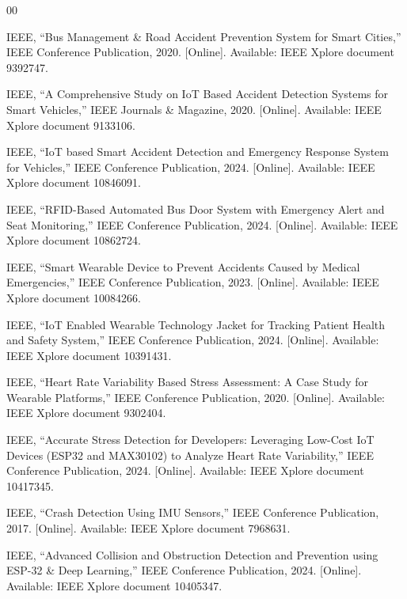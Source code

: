 \documentclass[conference]{IEEEtran}
\begin{document}
\begin{thebibliography}{00}

IEEE, ``Bus Management \& Road Accident Prevention System for Smart Cities,'' IEEE Conference Publication, 2020. [Online]. Available: IEEE Xplore document 9392747.

IEEE, ``A Comprehensive Study on IoT Based Accident Detection Systems for Smart Vehicles,'' IEEE Journals \& Magazine, 2020. [Online]. Available: IEEE Xplore document 9133106.

IEEE, ``IoT based Smart Accident Detection and Emergency Response System for Vehicles,'' IEEE Conference Publication, 2024. [Online]. Available: IEEE Xplore document 10846091.

IEEE, ``RFID-Based Automated Bus Door System with Emergency Alert and Seat Monitoring,'' IEEE Conference Publication, 2024. [Online]. Available: IEEE Xplore document 10862724.

IEEE, ``Smart Wearable Device to Prevent Accidents Caused by Medical Emergencies,'' IEEE Conference Publication, 2023. [Online]. Available: IEEE Xplore document 10084266.

IEEE, ``IoT Enabled Wearable Technology Jacket for Tracking Patient Health and Safety System,'' IEEE Conference Publication, 2024. [Online]. Available: IEEE Xplore document 10391431.

IEEE, ``Heart Rate Variability Based Stress Assessment: A Case Study for Wearable Platforms,'' IEEE Conference Publication, 2020. [Online]. Available: IEEE Xplore document 9302404.

IEEE, ``Accurate Stress Detection for Developers: Leveraging Low-Cost IoT Devices (ESP32 and MAX30102) to Analyze Heart Rate Variability,'' IEEE Conference Publication, 2024. [Online]. Available: IEEE Xplore document 10417345.

IEEE, ``Crash Detection Using IMU Sensors,'' IEEE Conference Publication, 2017. [Online]. Available: IEEE Xplore document 7968631.

IEEE, ``Advanced Collision and Obstruction Detection and Prevention using ESP-32 \& Deep Learning,'' IEEE Conference Publication, 2024. [Online]. Available: IEEE Xplore document 10405347.


\end{thebibliography}
\end{document}
